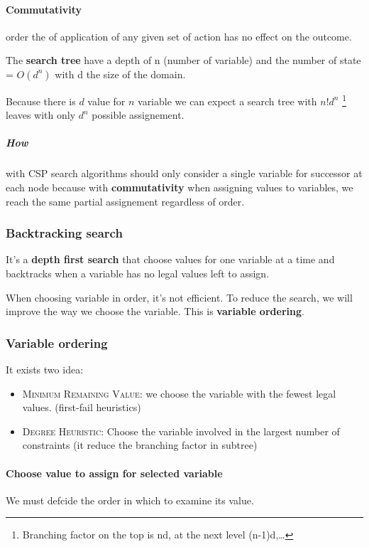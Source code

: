     
\paragraph{Commutativity} order the of application  of any given set of
action has no effect on the outcome.  

The \textbf{search tree} have a depth  of n (number of variable) and the
number of  state =  $O(d^n)$ with  d the  size of  the domain.  

Because there is $d$ value for $n$  variable we can expect a search tree
with $n! d^n$  \footnote{Branching factor on the top is  nd, at the next
level (n-1)d,\ldots} leaves with only $d^n$ possible assignement.

\subparagraph{\textbf{How}}  with  CSP  search  algorithms  should  only
consider  a single  variable for  successor  at each  node because  with
\textbf{commutativity} when assigning values  to variables, we reach the
same partial assignement regardless of order.


\subsubsection{Backtracking search}  It's a  \textbf{depth first search}  that choose
values for one variable at a time  and backtracks when a variable has no
legal values left  to assign. 

When  choosing variable  in order,  it's  not efficient.  To reduce  the
search,  we  will improve  the  way  we  choose  the variable.  This  is
\textbf{variable ordering}.

\subsubsection{Variable ordering}
It exists two idea:
\begin{itemize}
    \item \textsc{Minimum Remaining Value}: we choose the variable with the fewest legal values. (first-fail heuristics)
    \item \textsc{Degree Heuristic}: Choose the variable involved in the largest number of constraints (it reduce the branching factor in subtree)
\end{itemize}

\paragraph{Choose value  to assign  for selected  variable} 
We must defcide the order in which to examine its value.

